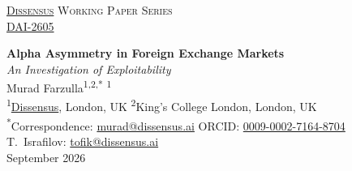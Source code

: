\documentclass[11pt]{article}
\newcommand{\papernum}{DAI-2605}              %
\newcommand{\paperdate}{September 2026}
\newcommand{\paperurl}{https://systems.ac/2/DAI-2605}
\begin{document}
\thispagestyle{firstpage}

\begin{center}
{\small\textsc{\href{https://dissensus.ai}{Dissensus} Working Paper Series}}\\[0.2em]
{\small \href{\paperurl}{\papernum}}
\end{center}

\vspace{1.5em}

\begin{center}
{\LARGE\bfseries Alpha Asymmetry in Foreign Exchange Markets}\\[0.5em]
{\large\itshape An Investigation of Exploitability}\\[1.5em]

{\large Murad Farzulla}\textsuperscript{1,2,*} \textsuperscript{1}\\[0.8em]

{\small
  \textsuperscript{1}\href{https://dissensus.ai}{Dissensus}, London, UK \quad
  \textsuperscript{2}King's College London, London, UK%
}\\[0.5em]

{\footnotesize
  \textsuperscript{*}Correspondence: \href{mailto:murad@dissensus.ai}{murad@dissensus.ai}
  \quad
  ORCID: \href{https://orcid.org/0009-0002-7164-8704}{0009-0002-7164-8704}\\
  T.\ Israfilov: \href{mailto:tofik@dissensus.ai}{tofik@dissensus.ai}%
}\\[0.3em]
{\footnotesize \paperdate}
\end{center}
\end{document}

